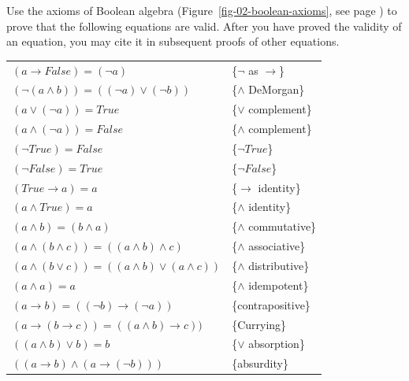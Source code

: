\begin{ExerciseList}
\Exercise Use the axioms of Boolean algebra (Figure~\ref{fig-02-boolean-axioms}, see page \pageref{fig-02-boolean-axioms}) to prove that the following equations are valid. After you have proved the validity of an equation, you may cite it in subsequent proofs of other equations.
\begin{center}
\label{some-boolean-theorems}
\begin{tabular}{ll}
$(a \rightarrow False) = (\neg a)$                                   & \{$\neg$ as $\rightarrow$\}\label{neg-as-imp} \\
$(\neg(a \wedge b)) = ((\neg a) \vee (\neg b))$                      & \{$\wedge$ DeMorgan\}      \label{and-DeMorgan} \\
$(a \vee (\neg a)) = True$                                           & \{$\vee$ complement\}      \label{or-complement} \\
$(a \wedge (\neg a)) = False$                                        & \{$\wedge$ complement\}    \label{and-complement} \\
$(\neg True) = False$                                                & \{$\neg True$\}            \label{not-True} \\
$(\neg False) = True$                                                & \{$\neg False$\}           \label{not-False} \\
$(True \rightarrow a) = a$                                           & \{$\rightarrow$ identity\} \label{imp-identity} \\
$(a \wedge True) = a$                                                & \{$\wedge$ identity\}      \label{and-identity} \\
$(a \wedge b) = (b \wedge a)$                                        & \{$\wedge$ commutative\}   \label{and-commutative} \\
$(a \wedge (b \wedge c)) = ((a \wedge b) \wedge c)$                  & \{$\wedge$ associative\}   \label{and-associative} \\
$(a \wedge (b \vee c)) = ((a \wedge b) \vee (a \wedge c))$           & \{$\wedge$ distributive\}  \label{and-distributive} \\
$(a \wedge a) = a$                                                   & \{$\wedge$ idempotent\}    \label{and-idempotent} \\
$(a \rightarrow b) = ((\neg b) \rightarrow (\neg a))$                & \{contrapositive\}         \label{contrapositive} \\
$(a \rightarrow (b \rightarrow c)) = ((a \wedge b) \rightarrow c))$  & \{Currying\}               \label{currying} \\
$((a \wedge b) \vee b) = b$                                          & \{$\vee$ absorption\}      \label{or-absorption} \\
$((a \rightarrow b) \wedge (a \rightarrow (\neg b)))$                & \{absurdity\}              \label{absurdity} \\
\end{tabular}
\end{center}

\end{ExerciseList}


